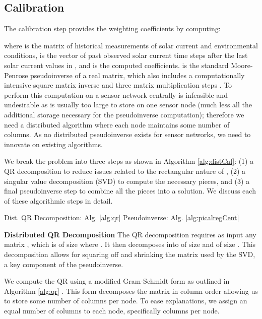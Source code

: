 \documentclass[prodmode,acmtosn]{acmsmall}
\begin{document}
\subsection{Calibration}
The calibration step provides the weighting coefficients by computing:

where  is the matrix of historical measurements of solar current and environmental conditions,  is the vector of past observed solar current  time steps after the last solar current values in , and  is the computed coefficients.
 is the standard Moore-Penrose pseudoinverse of a real matrix, which also includes a computationally intensive square matrix inverse and three matrix multiplication steps \cite{golubMatrixBook1996}.
To perform this computation on a sensor network centrally is infeasible and undesirable as  is usually too large to store on one sensor node (much less all the additional storage necessary for the pseudoinverse computation); therefore we need a distributed algorithm where each node maintains some number of columns.
As no distributed pseudoinverse exists for sensor networks, we need to innovate on existing algorithms.

We break the problem into three steps as shown in Algorithm \ref{alg:distCal}: (1) a QR decomposition to reduce issues related to the rectangular nature of , (2) a singular value decomposition (SVD) to compute the necessary pieces, and (3) a final pseudoinverse step to combine all the pieces into a solution.
We discuss each of these algorithmic steps in detail.

\begin{algorithm}
\caption{Distributed Calibration}\label{alg:distCal}
\begin{algorithmic}
\State 
\Comment Dist. QR Decomposition: Alg. \ref{alg:qr}
\State 
\State 
\Comment Pseudoinverse: Alg. \ref{alg:picalregCent}
\end{algorithmic}
\end{algorithm}

{\bf Distributed QR Decomposition}\newline
The QR decomposition requires as input any matrix , which is of size  where .
It then decomposes  into  of size  and  of size .
This decomposition allows for squaring off and shrinking the matrix used by the SVD, a key component of the pseudoinverse.

We compute the QR using a modified Gram-Schmidt form as outlined in Algorithm \ref{alg:qr} \cite{golubMatrixBook1996}.
This form decomposes the matrix in column order allowing us to store some number of columns per node.
To ease explanations, we assign an equal number of columns to each node, specifically  columns per node.
\end{document}
